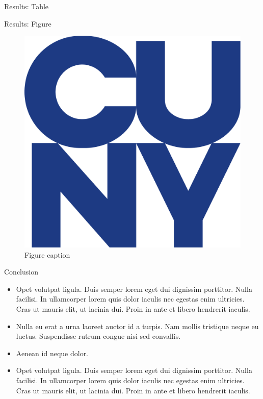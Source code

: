 \documentclass[final,hyperref={pdfpagelabels=false}]{beamer}
\begin{document}
\begin{frame}[t]
\begin{columns}[t]
\begin{column}{.465\textwidth}
\begin{block}{Results: Table}
            \end{block}


            \begin{block}{Results: Figure}

                \begin{figure}
                    \includegraphics[width=0.5\linewidth]{logo.png}
                    \caption{Figure caption}
                \end{figure}

            \end{block}


            \begin{block}{Conclusion}

                \begin{itemize}
                    \item Opet volutpat ligula. Duis semper lorem eget dui dignissim porttitor. Nulla facilisi. In ullamcorper lorem quis dolor iaculis nec egestas enim ultricies. Cras ut mauris elit, ut lacinia dui. Proin in ante et libero hendrerit iaculis.
                    \item Nulla eu erat a urna laoreet auctor id a turpis. Nam mollis tristique neque eu luctus. Suspendisse rutrum congue nisi sed convallis.
                    \item Aenean id neque dolor.
                    \item Opet volutpat ligula. Duis semper lorem eget dui dignissim porttitor. Nulla facilisi. In ullamcorper lorem quis dolor iaculis nec egestas enim ultricies. Cras ut mauris elit, ut lacinia dui. Proin in ante et libero hendrerit iaculis.
                \end{itemize}


\end{block}
\end{column}
\end{columns}
\end{frame}
\end{document}
